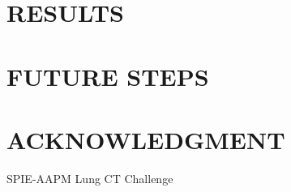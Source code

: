 \documentclass[letterpaper, 10 pt, conference]{ieeeconf}  %
\begin{document}
\section{RESULTS}

\section{FUTURE STEPS}


\addtolength{\textheight}{-12cm}   %







\section*{ACKNOWLEDGMENT}

SPIE-AAPM Lung CT Challenge

\begin{thebibliography}{99}

\end{thebibliography}
\end{document}

